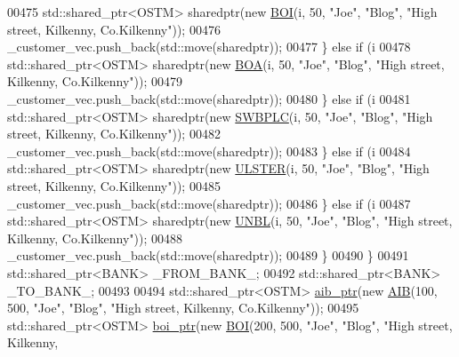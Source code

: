 \begin{DoxyCode}
00475             std::shared\_ptr<OSTM> sharedptr(\textcolor{keyword}{new} \hyperlink{class_b_o_i}{BOI}(i, 50, \textcolor{stringliteral}{"Joe"}, \textcolor{stringliteral}{"Blog"}, \textcolor{stringliteral}{"High street, Kilkenny,
       Co.Kilkenny"}));
00476             \_customer\_vec.push\_back(std::move(sharedptr));
00477         \} \textcolor{keywordflow}{else} \textcolor{keywordflow}{if} (i %
00478             std::shared\_ptr<OSTM> sharedptr(\textcolor{keyword}{new} \hyperlink{class_b_o_a}{BOA}(i, 50, \textcolor{stringliteral}{"Joe"}, \textcolor{stringliteral}{"Blog"}, \textcolor{stringliteral}{"High street, Kilkenny,
       Co.Kilkenny"}));
00479             \_customer\_vec.push\_back(std::move(sharedptr));
00480         \} \textcolor{keywordflow}{else} \textcolor{keywordflow}{if} (i %
00481             std::shared\_ptr<OSTM> sharedptr(\textcolor{keyword}{new} \hyperlink{class_s_w_b_p_l_c}{SWBPLC}(i, 50, \textcolor{stringliteral}{"Joe"}, \textcolor{stringliteral}{"Blog"}, \textcolor{stringliteral}{"High street, Kilkenny,
       Co.Kilkenny"}));
00482             \_customer\_vec.push\_back(std::move(sharedptr));
00483         \} \textcolor{keywordflow}{else} \textcolor{keywordflow}{if} (i %
00484             std::shared\_ptr<OSTM> sharedptr(\textcolor{keyword}{new} \hyperlink{class_u_l_s_t_e_r}{ULSTER}(i, 50, \textcolor{stringliteral}{"Joe"}, \textcolor{stringliteral}{"Blog"}, \textcolor{stringliteral}{"High street, Kilkenny,
       Co.Kilkenny"}));
00485             \_customer\_vec.push\_back(std::move(sharedptr));
00486         \} \textcolor{keywordflow}{else} \textcolor{keywordflow}{if} (i %
00487             std::shared\_ptr<OSTM> sharedptr(\textcolor{keyword}{new} \hyperlink{class_u_n_b_l}{UNBL}(i, 50, \textcolor{stringliteral}{"Joe"}, \textcolor{stringliteral}{"Blog"}, \textcolor{stringliteral}{"High street, Kilkenny,
       Co.Kilkenny"}));
00488             \_customer\_vec.push\_back(std::move(sharedptr));
00489         \}
00490     \}
00491     std::shared\_ptr<BANK> \_FROM\_BANK\_;
00492     std::shared\_ptr<BANK> \_TO\_BANK\_;
00493     
00494     std::shared\_ptr<OSTM> \hyperlink{class_my_test_c_ase_adad50e8278b64aa0321000b528e5362c_adad50e8278b64aa0321000b528e5362c}{aib\_ptr}(\textcolor{keyword}{new} \hyperlink{class_a_i_b}{AIB}(100, 500, \textcolor{stringliteral}{"Joe"}, \textcolor{stringliteral}{"Blog"}, \textcolor{stringliteral}{"High street, Kilkenny,
       Co.Kilkenny"}));
00495     std::shared\_ptr<OSTM> \hyperlink{class_my_test_c_ase_a5554de9e3e6393a89c66c036c529720b_a5554de9e3e6393a89c66c036c529720b}{boi\_ptr}(\textcolor{keyword}{new} \hyperlink{class_b_o_i}{BOI}(200, 500, \textcolor{stringliteral}{"Joe"}, \textcolor{stringliteral}{"Blog"}, \textcolor{stringliteral}{"High street, Kilkenny,
}
\end{DoxyCode}
